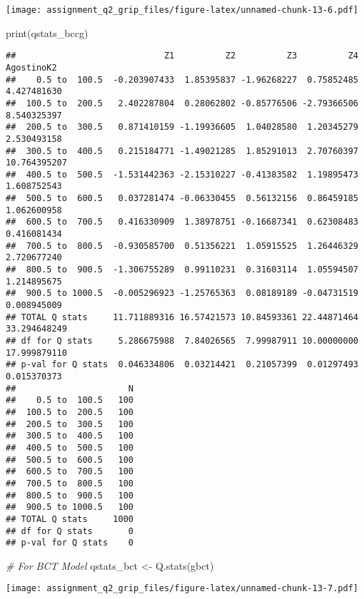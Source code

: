 \documentclass[
]{article}
\newenvironment{Shaded}{\begin{snugshade}}{\end{snugshade}}
\newcommand{\CommentTok}[1]{\textcolor[rgb]{0.56,0.35,0.01}{\textit{#1}}}
\newcommand{\FunctionTok}[1]{\textcolor[rgb]{0.00,0.00,0.00}{#1}}
\newcommand{\NormalTok}[1]{#1}
\newcommand{\OtherTok}[1]{\textcolor[rgb]{0.56,0.35,0.01}{#1}}
\begin{document}
\texttt{[image: assignment\_q2\_grip\_files/figure-latex/unnamed-chunk-13-6.pdf]}

\begin{Shaded}
\begin{Highlighting}[]
\FunctionTok{print}\NormalTok{(qstats\_bccg)}
\end{Highlighting}
\end{Shaded}

\begin{verbatim}
##                             Z1          Z2          Z3          Z4   AgostinoK2
##    0.5 to  100.5  -0.203907433  1.85395837 -1.96268227  0.75852485  4.427481630
##  100.5 to  200.5   2.402287804  0.28062802 -0.85776506 -2.79366506  8.540325397
##  200.5 to  300.5   0.871410159 -1.19936605  1.04028580  1.20345279  2.530493158
##  300.5 to  400.5   0.215184771 -1.49021285  1.85291013  2.70760397 10.764395207
##  400.5 to  500.5  -1.531442363 -2.15310227 -0.41383582  1.19895473  1.608752543
##  500.5 to  600.5   0.037281474 -0.06330455  0.56132156  0.86459185  1.062600958
##  600.5 to  700.5   0.416330909  1.38978751 -0.16687341  0.62308483  0.416081434
##  700.5 to  800.5  -0.930585700  0.51356221  1.05915525  1.26446329  2.720677240
##  800.5 to  900.5  -1.306755289  0.99110231  0.31603114  1.05594507  1.214895675
##  900.5 to 1000.5  -0.005296923 -1.25765363  0.08189189 -0.04731519  0.008945009
## TOTAL Q stats     11.711889316 16.57421573 10.84593361 22.44871464 33.294648249
## df for Q stats     5.286675988  7.84026565  7.99987911 10.00000000 17.999879110
## p-val for Q stats  0.046334806  0.03214421  0.21057399  0.01297493  0.015370373
##                      N
##    0.5 to  100.5   100
##  100.5 to  200.5   100
##  200.5 to  300.5   100
##  300.5 to  400.5   100
##  400.5 to  500.5   100
##  500.5 to  600.5   100
##  600.5 to  700.5   100
##  700.5 to  800.5   100
##  800.5 to  900.5   100
##  900.5 to 1000.5   100
## TOTAL Q stats     1000
## df for Q stats       0
## p-val for Q stats    0
\end{verbatim}

\begin{Shaded}
\begin{Highlighting}[]
\CommentTok{\# For BCT Model}
\NormalTok{qstats\_bct }\OtherTok{\textless{}{-}} \FunctionTok{Q.stats}\NormalTok{(gbct)}
\end{Highlighting}
\end{Shaded}

\texttt{[image: assignment\_q2\_grip\_files/figure-latex/unnamed-chunk-13-7.pdf]}
\end{document}

